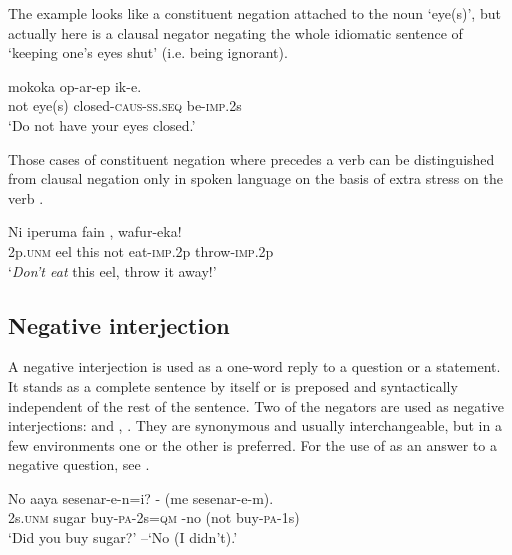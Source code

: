 The example  looks like a constituent negation attached to the noun \linebreak `eye(s)', but actually   here is a clausal negator negating the whole idiomatic sentence of `keeping one's eyes shut' (i.e. being ignorant).

\ea%
\label{ex:6:x1114}
\gll {}  mokoka  op-ar-ep  ik-e. \\
not  eye(s)  closed-\textsc{caus}-\textsc{ss}.\textsc{seq}  be-\textsc{imp}.2s\\
\glt `Do not have your eyes closed.'
\z

Those cases of constituent negation where   precedes a verb can be distinguished from clausal negation only in spoken language on the basis of extra stress on the verb .

\ea%
\label{ex:6:x1110}
\gll Ni  iperuma  fain    ,  wafur-eka! \\
2p.\textsc{unm}  eel  this  not  eat-\textsc{imp}.2p  throw-\textsc{imp}.2p\\
\glt `\textit{Don't eat}  this eel, throw it away!'
\z

\subsection{Negative interjection} \label{sec:6.2.3}

A negative interjection is used as a one-word reply to a question or a statement. It stands as a complete sentence by itself or is preposed and syntactically independent of the rest of the sentence. Two of the negators are used as negative interjections:  and  , . They are synonymous and usually interchangeable, but in a few environments one or the other is preferred. For the use of  as an answer to a negative question, see .

\ea%
\label{ex:6:x1115}
\gll No  aaya  sesenar-e-n=i?  -  (me  sesenar-e-m). \\
2s.\textsc{unm}  sugar  buy-\textsc{pa}-2s=\textsc{qm}  -no  (not  buy-\textsc{pa}-1s)\\
\glt `Did you buy sugar?' --`No (I didn't).'
\z


